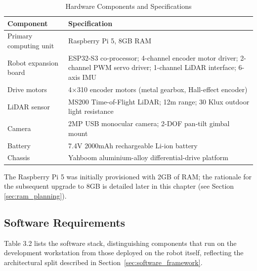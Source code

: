 \begin{table}[H]
\centering
\caption{Hardware Components and Specifications}
\label{tab:hardware_requirements}

\begin{tabular}{|p{4cm}|p{10cm}|}
\hline
\textbf{Component} & \textbf{Specification} \\
\hline

Primary computing unit & Raspberry Pi 5, 8GB RAM \\
\hline

Robot expansion board & ESP32-S3 co-processor; 4-channel encoder motor driver; 2-channel PWM servo driver; 1-channel LiDAR interface; 6-axis IMU \\
\hline

Drive motors & 4$\times$310 encoder motors (metal gearbox, Hall-effect encoder) \\
\hline

LiDAR sensor & MS200 Time-of-Flight LiDAR; 12m range; 30 Klux outdoor light resistance \\
\hline

Camera & 2MP USB monocular camera; 2-DOF pan-tilt gimbal mount \\
\hline

Battery & 7.4V 2000mAh rechargeable Li-ion battery \\
\hline

Chassis & Yahboom aluminium-alloy differential-drive platform \\
\hline

\end{tabular}

\end{table}
The Raspberry Pi 5 was initially provisioned with 2GB of RAM; the rationale for the
subsequent upgrade to 8GB is detailed later in this chapter (see Section
\ref{sec:ram_planning}).

\subsection{Software Requirements}

Table 3.2 lists the software stack, distinguishing components that run on the
development workstation from those deployed on the robot itself, reflecting the
architectural split described in Section~\ref{sec:software_framework}.

